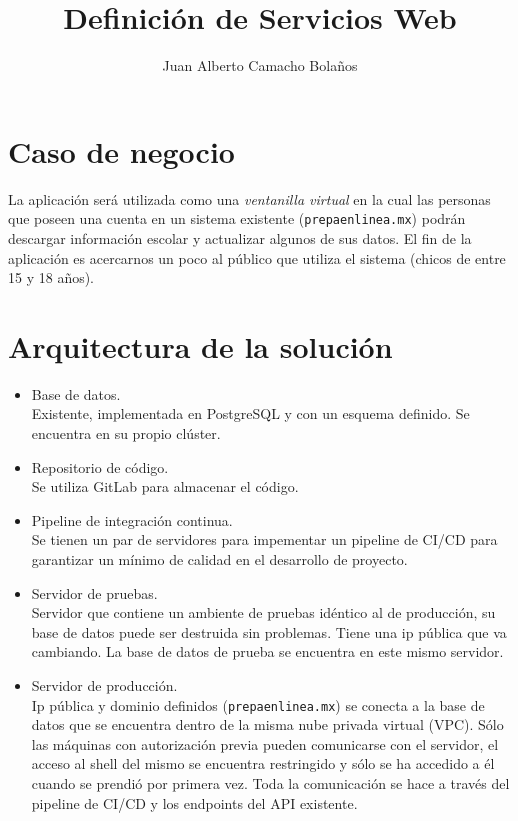 \documentclass{article}
\author{Juan Alberto Camacho Bolaños}
\title{Definición de Servicios Web}
\begin{document}
\maketitle

\section{Caso de negocio}
La aplicación será utilizada como una \textit{ventanilla virtual} en
la cual las personas que poseen una cuenta en un sistema existente
(\texttt{prepaenlinea.mx}) podrán descargar información escolar y
actualizar algunos de sus datos. El fin de la aplicación es acercarnos
un poco al público que utiliza el sistema (chicos de entre 15 y 18
años).

\section{Arquitectura de la solución}

\begin{itemize}

\item Base de datos.\\
  Existente, implementada en PostgreSQL y con un esquema definido. Se
  encuentra en su propio clúster.
\item Repositorio de código.\\
  Se utiliza GitLab para almacenar el código.
\item Pipeline de integración continua.\\
  Se tienen un par de servidores para impementar un pipeline de CI/CD
  para garantizar un mínimo de calidad en el desarrollo de proyecto.
\item Servidor de pruebas.\\
  Servidor que contiene un ambiente de pruebas idéntico al de
  producción, su base de datos puede ser destruida sin
  problemas. Tiene una ip pública que va cambiando. La base de datos
  de prueba se encuentra en este mismo servidor.
\item Servidor de producción.\\
  Ip pública y dominio definidos (\texttt{prepaenlinea.mx}) se conecta
  a la base de datos que se encuentra dentro de la misma nube privada
  virtual (VPC). Sólo las máquinas con autorización previa pueden
  comunicarse con el servidor, el acceso al shell del mismo se
  encuentra restringido y sólo se ha accedido a él cuando se prendió
  por primera vez. Toda la comunicación se hace a través del pipeline
  de CI/CD y los endpoints del API existente.
\end{itemize}
\end{document}

